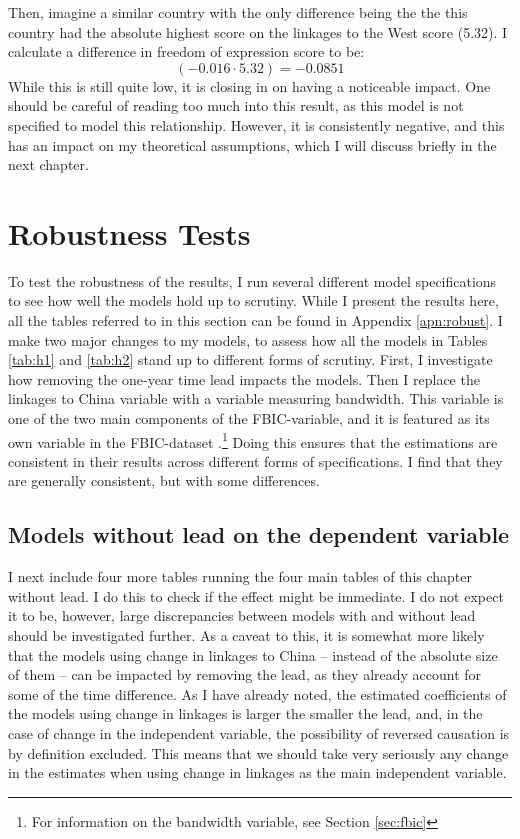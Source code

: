 Then, imagine a similar country with the only difference being the the this country had the absolute highest score on the linkages to the West score (5.32). I calculate a difference in freedom of expression score to be:
\begin{equation*}
    (-0.016 \cdot 5.32) = -0.0851
\end{equation*}
While this is still quite low, it is closing in on having a noticeable impact. One should be careful of reading too much into this result, as this model is not specified to model this relationship. However, it is consistently negative, and this has an impact on my theoretical assumptions, which I will discuss briefly in the next chapter.

\section{Robustness Tests} \label{sec:robust}
To test the robustness of the results, I run several different model specifications to see how well the models hold up to scrutiny. While I present the results here, all the tables referred to in this section can be found in Appendix \ref{apn:robust}. I make two major changes to my models, to assess how all the models in Tables \ref{tab:h1} and \ref{tab:h2} stand up to different forms of scrutiny. First, I investigate how removing the one-year time lead impacts the models. Then I replace the linkages to China variable with a variable measuring bandwidth. This variable is one of the two main components of the FBIC-variable, and it is featured as its own variable in the FBIC-dataset \citep{moyer_china-us_2021}.\footnote{For information on the bandwidth variable, see Section \ref{sec:fbic}} Doing this ensures that the estimations are consistent in their results across different forms of specifications. I find that they are generally consistent, but with some differences.

\subsection{Models without lead on the dependent variable}
I next include four more tables running the four main tables of this chapter without lead. I do this to check if the effect might be immediate. I do not expect it to be, however, large discrepancies between models with and without lead should be investigated further. As a caveat to this, it is somewhat more likely that the models using change in linkages to China -- instead of the absolute size of them -- can be impacted by removing the lead, as they already account for some of the time difference. As I have already noted, the estimated coefficients of the models using change in linkages is larger the smaller the lead, and, in the case of change in the independent variable, the possibility of reversed causation is by definition excluded. This means that we should take very seriously any change in the estimates when using change in linkages as the main independent variable.

